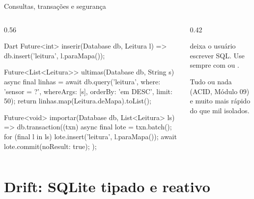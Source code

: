 \documentclass[aspectratio=169,10pt]{beamer}
\begin{document}
\begin{frame}[fragile]{Consultas, transações e segurança}
  \begin{columns}[T]
    \begin{column}{0.56\textwidth}
\begin{codigo}[title=CRUD com sqflite]{Dart}
Future<int> inserir(Database db, Leitura l) =>
    db.insert('leitura', l.paraMapa());

Future<List<Leitura>> ultimas(Database db, String s) async {
  final linhas = await db.query('leitura',
      where: 'sensor = ?', whereArgs: [s],
      orderBy: 'em DESC', limit: 50);
  return linhas.map(Leitura.deMapa).toList();
}

Future<void> importar(Database db, List<Leitura> ls) =>
    db.transaction((txn) async {
      final lote = txn.batch();
      for (final l in ls) lote.insert('leitura', l.paraMapa());
      await lote.commit(noResult: true);
    });
\end{codigo}
    \end{column}
    \begin{column}{0.42\textwidth}
      \begin{erro}
         deixa o usuário escrever SQL. Use sempre  com  ou .
      \end{erro}
      \begin{conceito}
        Tudo ou nada (ACID, Módulo 09) e muito mais rápido do que mil  isolados.
      \end{conceito}
    \end{column}
  \end{columns}
\end{frame}

\section{Drift: SQLite tipado e reativo}
\end{document}
